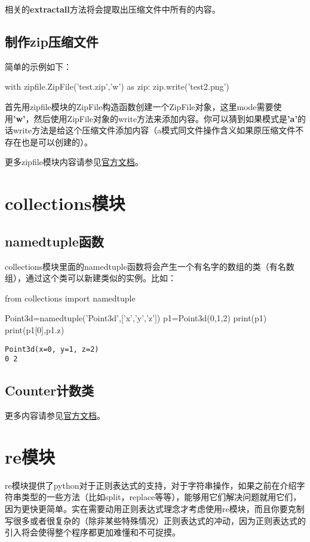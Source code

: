\documentclass[12pt,oneside]{book}
\begin{document}
\begin{common-format}
相关的\textbf{extractall}方法将会提取出压缩文件中所有的内容。

\section{制作zip压缩文件}
简单的示例如下：
\begin{tcbpython}[]
with zipfile.ZipFile('test.zip','w') as zip:
    zip.write('test2.png')
\end{tcbpython}
首先用zipfile模块的ZipFile构造函数创建一个ZipFile对象，这里mode需要使用\textbf{'w'}，然后使用ZipFile对象的write方法来添加内容。你可以猜到如果模式是\textbf{'a'}的话write方法是给这个压缩文件添加内容（a模式同文件操作含义如果原压缩文件不存在也是可以创建的）。



\begin{large}
更多zipfile模块内容请参见\href{https://docs.python.org/3.4/library/zipfile.html}{官方文档}。
\end{large}


\chapter{collections模块}
\section{namedtuple函数}
collections模块里面的namedtuple函数将会产生一个有名字的数组的类（有名数组），通过这个类可以新建类似的实例。比如：
\begin{tcbpython}[]
from collections import namedtuple

Point3d=namedtuple('Point3d',['x','y','z'])
p1=Point3d(0,1,2)
print(p1)
print(p1[0],p1.z)
\end{tcbpython}
\begin{Verbatim}
Point3d(x=0, y=1, z=2)
0 2
\end{Verbatim}



\section{Counter计数类}

\begin{large}
更多内容请参见\href{https://docs.python.org/3/library/collections.html}{官方文档}。
\end{large}



\chapter{re模块}
\label{sec:re模块}
re模块提供了python对于正则表达式的支持，对于字符串操作，如果之前在介绍字符串类型的一些方法（比如split，replace等等），能够用它们解决问题就用它们，因为更快更简单。实在需要动用正则表达式理念才考虑使用re模块，而且你要克制写很多或者很复杂的（除非某些特殊情况）正则表达式的冲动，因为正则表达式的引入将会使得整个程序都更加难懂和不可捉摸。


\end{common-format}
\end{document}
